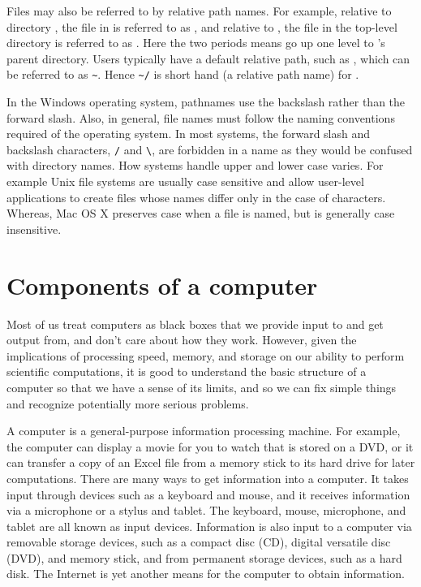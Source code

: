 Files may also be referred to by relative path names.  For example,
relative to directory , the file  in
 is referred to as , and relative to
, the file  in the top-level directory is
referred to as .  Here the two periods means go up one
level to 's parent directory.  Users typically have a
default relative path, such as , which can be
referred to as \verb+~+.  Hence \verb+~/+ is short
hand (a relative path name) for .

In the Windows operating system, pathnames use the backslash rather
than the forward slash.  Also, in general, file names must follow the
naming conventions required of the operating system. In most systems,
the forward slash and backslash characters, \verb+/+ and \verb+\+, are
forbidden in a name as they would be confused with directory
names. How systems handle upper and lower case varies.  For example
Unix file systems are usually case sensitive and allow user-level
applications to create files whose names differ only in the case of
characters. Whereas, Mac OS X preserves case when a file is named, but
is generally case insensitive.


\section{Components of a computer}\label{sec:components}
Most of us treat computers as black boxes that we provide input to and
get output from, and don't care about how they work. However, given
the implications of processing speed, memory, and storage on our
ability to perform scientific computations, it is good to understand
the basic structure of a computer so that we have a sense of its
limits, and so we can fix simple things and recognize potentially more
serious problems.

A computer is a general-purpose information processing machine.  For
example, the computer can display a movie for you to watch that is
stored on a DVD, or it can transfer a copy of an Excel file from a
memory stick to its hard drive for later computations.  There are many
ways to get information into a computer.  It takes input through
devices such as a keyboard and mouse, and it receives information via
a microphone or a stylus and tablet.  The keyboard, mouse, microphone,
and tablet are all known as input devices.  Information is also input
to a computer via removable storage devices, such as a compact disc
(CD), digital versatile disc (DVD), and memory stick, and from
permanent storage devices, such as a hard disk.  The Internet is yet
another means for the computer to obtain information.

